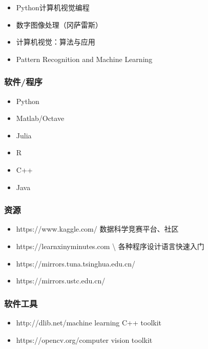 \documentclass{beamer}
\newenvironment{itemizedot}{\begin{itemize} \renewcommand{\labelitemi}{$\bullet$}\renewcommand{\labelitemii}{$\bullet$}\renewcommand{\labelitemiii}{$\bullet$}\renewcommand{\labelitemiv}{$\bullet$}}{\end{itemize}}
\begin{document}
{{\begin{frame}
\begin{itemizedot}
    \item Python计算机视觉编程
    
    \item 数字图像处理（冈萨雷斯）
    
    \item 计算机视觉：算法与应用
    
    \item Pattern Recognition and Machine Learning
  \end{itemizedot}
\end{frame}}{\begin{frame}
  \frametitle{软件/程序}
  
  
  \begin{itemizedot}
    \item Python
    
    \item Matlab/Octave
    
    \item Julia
    
    \item R
    
    \item C++
    
    \item Java
  \end{itemizedot}
\end{frame}}{\begin{frame}
  \frametitle{资源}
  
  
  \begin{itemizedot}
    \item https://www.kaggle.com/ 数据科学竞赛平台、社区
    
    \item https://learnxinyminutes.com \textbackslash
    各种程序设计语言快速入门
    
    \item https://mirrors.tuna.tsinghua.edu.cn/
    
    \item https://mirrors.ustc.edu.cn/
  \end{itemizedot}
\end{frame}}{\begin{frame}
  \frametitle{软件工具}
  \begin{itemizedot}
    \item http://dlib.net/\qquad machine learning C++ toolkit
    
    \item https://opencv.org/\quad computer vision toolkit
    

\end{itemizedot}
\end{frame}}}
\end{document}
